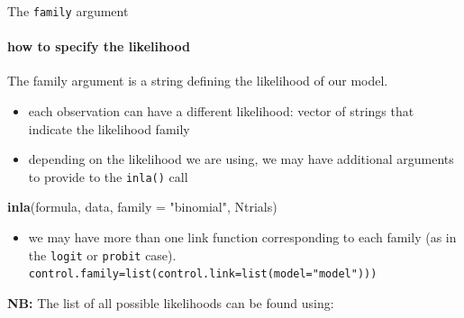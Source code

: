 \documentclass[9pt,ignorenonframetext,]{beamer}
\newenvironment{Shaded}{\begin{snugshade}}{\end{snugshade}}
\newcommand{\DataTypeTok}[1]{\textcolor[rgb]{0.13,0.29,0.53}{#1}}
\newcommand{\KeywordTok}[1]{\textcolor[rgb]{0.13,0.29,0.53}{\textbf{#1}}}
\newcommand{\NormalTok}[1]{#1}
\newcommand{\OperatorTok}[1]{\textcolor[rgb]{0.81,0.36,0.00}{\textbf{#1}}}
\newcommand{\StringTok}[1]{\textcolor[rgb]{0.31,0.60,0.02}{#1}}
\providecommand{\tightlist}{%
  \setlength{\itemsep}{0pt}\setlength{\parskip}{0pt}}
\begin{document}
\begin{frame}[fragile]{The \texttt{family} argument}
\protect\hypertarget{the-family-argument}{}

\framesubtitle{how to specify the likelihood}

The family argument is a string defining the likelihood of our model.

\begin{itemize}
\item
  each observation can have a different likelihood: vector of strings
  that indicate the likelihood family
\item
  depending on the likelihood we are using, we may have additional
  arguments to provide to the \texttt{inla()} call
\end{itemize}

\begin{Shaded}
\begin{Highlighting}[]
\KeywordTok{inla}\NormalTok{(formula, data, }\DataTypeTok{family =} \StringTok{"binomial"}\NormalTok{, Ntrials)}
\end{Highlighting}
\end{Shaded}

\begin{itemize}
\tightlist
\item
  we may have more than one link function corresponding to each family
  (as in the \texttt{logit} or \texttt{probit} case).
  \texttt{control.family=list(control.link=list(model="model")))}
\end{itemize}

\vspace{0.15cm}

\textbf{NB:} The list of all possible likelihoods can be found using:

\begin{Shaded}
\end{Shaded}

\end{frame}
\end{document}
